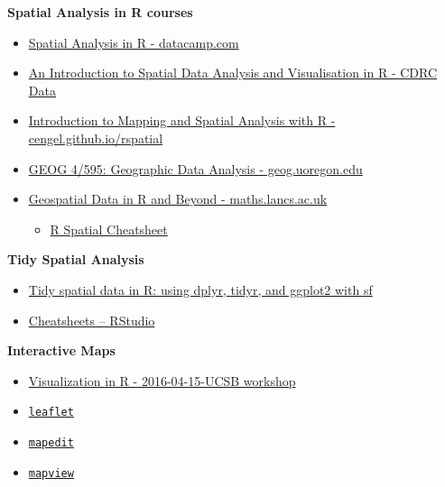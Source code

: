 \documentclass[]{book}
\providecommand{\tightlist}{%
  \setlength{\itemsep}{0pt}\setlength{\parskip}{0pt}}
\theoremstyle{definition}
\theoremstyle{definition}
\theoremstyle{definition}
\theoremstyle{remark}
\begin{document}
\textbf{Spatial Analysis in R courses}

\begin{itemize}
\tightlist
\item
  \href{https://www.datacamp.com/courses/working-with-geospatial-data-in-r}{Spatial
  Analysis in R - datacamp.com}
\item
  \href{https://data.cdrc.ac.uk/tutorial/an-introduction-to-spatial-data-analysis-and-visualisation-in-r}{An
  Introduction to Spatial Data Analysis and Visualisation in R - CDRC
  Data}
\item
  \href{https://cengel.github.io/rspatial/}{Introduction to Mapping and
  Spatial Analysis with R - cengel.github.io/rspatial}
\item
  \href{http://geog.uoregon.edu/bartlein/courses/geog495/index.html}{GEOG
  4/595: Geographic Data Analysis - geog.uoregon.edu}
\item
  \href{http://www.maths.lancs.ac.uk/~rowlings/Teaching/UseR2012/index.html}{Geospatial
  Data in R and Beyond - maths.lancs.ac.uk}

  \begin{itemize}
  \tightlist
  \item
    \href{http://www.maths.lancs.ac.uk/~rowlings/Teaching/UseR2012/cheatsheet.html}{R
    Spatial Cheatsheet}
  \end{itemize}
\end{itemize}

\textbf{Tidy Spatial Analysis}

\begin{itemize}
\tightlist
\item
  \href{http://strimas.com/r/tidy-sf/}{Tidy spatial data in R: using
  dplyr, tidyr, and ggplot2 with sf}
\item
  \href{https://www.rstudio.com/resources/cheatsheets/}{Cheatsheets --
  RStudio}
\end{itemize}

\textbf{Interactive Maps}

\begin{itemize}
\tightlist
\item
  \href{http://remi-daigle.github.io/2016-04-15-UCSB/viz/}{Visualization
  in R - 2016-04-15-UCSB workshop}
\item
  \href{http://rstudio.github.io/leaflet/}{\texttt{leaflet}}
\item
  \href{http://r-spatial.org/r/2017/01/30/mapedit_intro.html}{\texttt{mapedit}}
\item
  \href{https://r-spatial.github.io/mapview/}{\texttt{mapview}}
\end{itemize}
\end{document}
